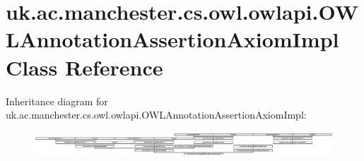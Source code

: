 \hypertarget{classuk_1_1ac_1_1manchester_1_1cs_1_1owl_1_1owlapi_1_1_o_w_l_annotation_assertion_axiom_impl}{\section{uk.\-ac.\-manchester.\-cs.\-owl.\-owlapi.\-O\-W\-L\-Annotation\-Assertion\-Axiom\-Impl Class Reference}
\label{classuk_1_1ac_1_1manchester_1_1cs_1_1owl_1_1owlapi_1_1_o_w_l_annotation_assertion_axiom_impl}
}
Inheritance diagram for uk.\-ac.\-manchester.\-cs.\-owl.\-owlapi.\-O\-W\-L\-Annotation\-Assertion\-Axiom\-Impl\-:\begin{figure}[H]
\begin{center}
\leavevmode
\includegraphics[height=0.956720cm]{classuk_1_1ac_1_1manchester_1_1cs_1_1owl_1_1owlapi_1_1_o_w_l_annotation_assertion_axiom_impl}
\end{center}
\end{figure}
